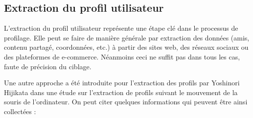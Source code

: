 \subsection{Extraction du profil utilisateur}
L'extraction du profil utilisateur représente une étape clé dans le processus de profilage. Elle peut se faire de manière générale par extraction des données (amis, contenu partagé, coordonnées, etc.) à partir des sites web, des réseaux sociaux ou des plateformes de e-commerce. Néanmoins ceci ne suffit pas dans tous les cas, faute de précision du ciblage.

Une autre approche a été introduite pour l'extraction des profils par Yoshinori Hijikata \cite{profil} dans une étude sur l'extraction de profils suivant le mouvement de la souris de l'ordinateur. On peut citer quelques informations qui peuvent être ainsi collectées :

